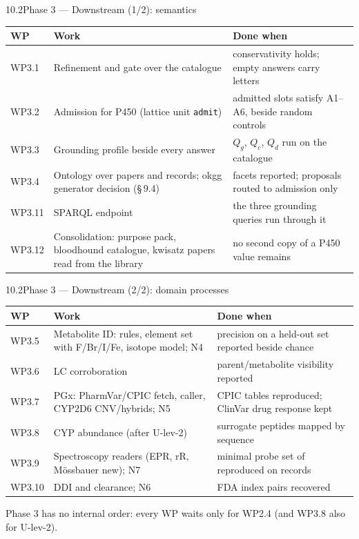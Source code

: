 \documentclass[aspectratio=169,11pt]{beamer}
\newcommand{\cid}[1]{\texttt{\detokenize{#1}}}
\newcommand{\src}[1]{\par\vfill{\scriptsize\color{black!60}#1\par}}
\begin{document}
\newcommand{\wpheadthree}{\toprule \textbf{WP} & \textbf{Work} & \textbf{Done when} \\ \midrule}
\begin{frame}{10.2\quad Phase 3 --- Downstream (1/2): semantics}
\footnotesize
\begin{tabularx}{\textwidth}{@{}l Y L{66mm}@{}}
\wpheadthree
WP3.1 & Refinement and gate over the catalogue & conservativity holds; empty answers carry letters \\
WP3.2 & Admission for P450 (lattice unit \texttt{admit}) & admitted slots satisfy A1--A6, beside random controls \\
WP3.3 & Grounding profile beside every answer & $Q_g$, $Q_c$, $Q_d$ run on the catalogue \\
WP3.4 & Ontology over papers and records; okgg generator decision (\S\,9.4) & facets reported; proposals routed to admission only \\
WP3.11 & SPARQL endpoint & the three grounding queries run through it \\
WP3.12 & Consolidation: purpose pack, bloodhound catalogue, kwisatz papers read from the library & no second copy of a P450 value remains \\
\bottomrule
\end{tabularx}
\end{frame}

\begin{frame}{10.2\quad Phase 3 --- Downstream (2/2): domain processes}
\footnotesize
\begin{tabularx}{\textwidth}{@{}l Y L{66mm}@{}}
\wpheadthree
WP3.5 & Metabolite ID: rules, element set with F/Br/I/Fe, isotope model; N4 & precision on a held-out set reported beside chance \\
WP3.6 & LC corroboration & parent/metabolite visibility reported \\
WP3.7 & PGx: PharmVar/CPIC fetch, caller, CYP2D6 CNV/hybrids; N5 & CPIC tables reproduced; ClinVar drug response kept \\
WP3.8 & CYP abundance (after U-lev-2) & surrogate peptides mapped by sequence \\
WP3.9 & Spectroscopy readers (EPR, rR, M\"ossbauer new); N7 & minimal probe set of \cid{exp_04_panel} reproduced on records \\
WP3.10 & DDI and clearance; N6 & FDA index pairs recovered \\
\bottomrule
\end{tabularx}
\src{Phase 3 has no internal order: every WP waits only for WP2.4 (and WP3.8 also for U-lev-2).}
\end{frame}
\end{document}
